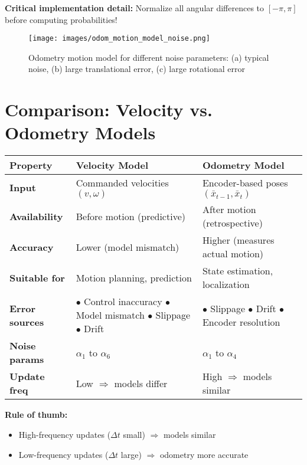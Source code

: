 \textbf{Critical implementation detail:} Normalize all angular differences to $[-\pi, \pi]$ before computing probabilities!

\begin{figure}[H]
  \begin{center}
    \texttt{[image: images/odom\_motion\_model\_noise.png]}
  \end{center}
  \caption{Odometry motion model for different noise parameters: (a) typical noise, (b) large translational error, (c) large rotational error}
\end{figure}

\section{Comparison: Velocity vs. Odometry Models}

\begin{tcolorbox}[colback=green!5!white,colframe=green!60!black,title=Model Comparison]

\begin{tabular}{|l|p{5cm}|p{5cm}|}
\hline
\textbf{Property} & \textbf{Velocity Model} & \textbf{Odometry Model} \\
\hline
\textbf{Input} & Commanded velocities $(v, \omega)$ & Encoder-based poses $(\bar{x}_{t-1}, \bar{x}_t)$ \\
\hline
\textbf{Availability} & Before motion (predictive) & After motion (retrospective) \\
\hline
\textbf{Accuracy} & Lower (model mismatch) & Higher (measures actual motion) \\
\hline
\textbf{Suitable for} & Motion planning, prediction & State estimation, localization \\
\hline
\textbf{Error sources} &
$\bullet$ Control inaccuracy \newline
$\bullet$ Model mismatch \newline
$\bullet$ Slippage \newline
$\bullet$ Drift &
$\bullet$ Slippage \newline
$\bullet$ Drift \newline
$\bullet$ Encoder resolution \\
\hline
\textbf{Noise params} & $\alpha_1$ to $\alpha_6$ & $\alpha_1$ to $\alpha_4$ \\
\hline
\textbf{Update freq} & Low $\Rightarrow$ models differ & High $\Rightarrow$ models similar \\
\hline
\end{tabular}

\vspace{3mm}
\textbf{Rule of thumb:}
\begin{itemize}
    \item High-frequency updates ($\Delta t$ small) $\Rightarrow$ models similar
    \item Low-frequency updates ($\Delta t$ large) $\Rightarrow$ odometry more accurate
\end{itemize}

\end{tcolorbox}

